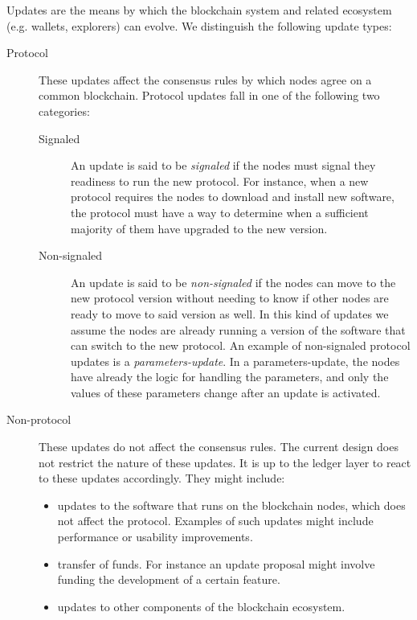 \documentclass[11pt,a4paper]{article}
\begin{document}
Updates are the means by which the blockchain system and related ecosystem (e.g.
wallets, explorers) can evolve. We distinguish the following update types:
\begin{description}
\item[Protocol] These updates affect the consensus rules by which nodes agree on
  a common blockchain. Protocol updates fall in one of the following two
  categories:
  \begin{description}
  \item[Signaled] An update is said to be \emph{signaled} if the nodes must
    signal they readiness to run the new protocol. For instance, when a new
    protocol requires the nodes to download and install new software, the
    protocol must have a way to determine when a sufficient majority of them
    have upgraded to the new version.
  \item[Non-signaled] An update is said to be \emph{non-signaled} if the nodes
    can move to the new protocol version without needing to know if other nodes
    are ready to move to said version as well. In this kind of updates we assume
    the nodes are already running a version of the software that can switch to
    the new protocol. An example of non-signaled protocol updates is a
    \emph{parameters-update}. In a parameters-update, the nodes have already the
    logic for handling the parameters, and only the values of these parameters
    change after an update is activated.
  \end{description}
\item[Non-protocol] These updates do not affect the consensus rules. The current
  design does not restrict the nature of these updates. It is up to the ledger
  layer to react to these updates accordingly. They might include:
  \begin{itemize}
  \item updates to the software that runs on the blockchain nodes, which does
    not affect the protocol. Examples of such updates might include performance
    or usability improvements.
  \item transfer of funds. For instance an update proposal might involve funding
    the development of a certain feature.
  \item updates to other components of the blockchain ecosystem.
  \end{itemize}
\end{description}
\end{document}
